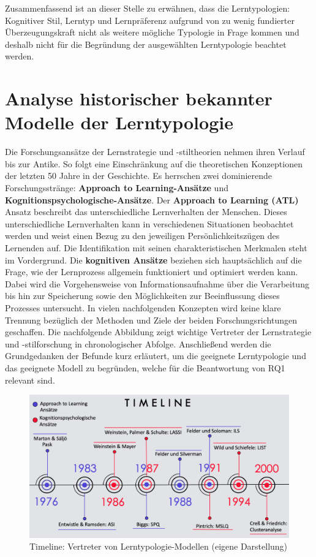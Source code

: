         Zusammenfassend ist an dieser Stelle zu erwähnen, dass die Lerntypologien: Kognitiver Stil, Lerntyp und Lernpräferenz aufgrund von zu wenig fundierter Überzeugungskraft nicht 
        als weitere mögliche Typologie in Frage kommen und deshalb nicht für die Begründung der ausgewählten Lerntypologie beachtet werden.
        
        \section{Analyse historischer bekannter Modelle der Lerntypologie} \label{AnalyseLernstilmodelle}

    Die  Forschungsansätze der Lernstrategie und -stiltheorien nehmen ihren Verlauf bis zur Antike. 
    So folgt eine Einschränkung auf die theoretischen Konzeptionen der letzten 50 Jahre in der Geschichte. Es herrschen zwei dominierende Forschungsstränge: 
    \textbf{\glqq Approach to Learning-Ansätze\grqq{}} und \textbf{\glqq Kognitionspsychologische-Ansätze\grqq{}}.
    Der  \textbf{ Approach to Learning (ATL)} Ansatz beschreibt das unterschiedliche Lernverhalten der Menschen. Dieses unterschiedliche 
    Lernverhalten kann in verschiedenen Situationen beobachtet werden und weist einen
    Bezug zu den jeweiligen Persönlichkeitszügen des Lernenden auf. 
    Die Identifikation mit seinen charakteristischen Merkmalen steht im Vordergrund. 
    Die  \textbf{kognitiven Ansätze} beziehen sich hauptsächlich auf die Frage, wie der Lernprozess allgemein funktioniert und optimiert werden kann. Dabei wird die Vorgehensweise von Informationsaufnahme über die
    Verarbeitung bis hin zur Speicherung sowie den Möglichkeiten zur Beeinflussung dieses Prozesses untersucht. In vielen nachfolgenden Konzepten wird keine klare Trennung bezüglich der Methoden und Ziele der beiden 
    Forschungsrichtungen geschaffen. \parencite[8]{Martin.2012} 
    Die nachfolgende Abbildung zeigt wichtige Vertreter der Lernstrategie und -stilforschung in chronologischer Abfolge. Anschließend werden die Grundgedanken der Befunde kurz erläutert, um 
    die geeignete Lerntypologie und das geeignete Modell zu begründen, welche für die Beantwortung von RQ1 relevant sind. 

    
    \begin{figure}[H]
        \centering
        \includegraphics[width=0.8\linewidth]{images/timeline.png}
        \caption[Timeline: Vertreter von Lerntypologie-Modellen]{Timeline: Vertreter von Lerntypologie-Modellen (eigene Darstellung)}
        \label{fig:Timeline: Vertreter von Lerntypologie-Modellen}
    \end{figure}

